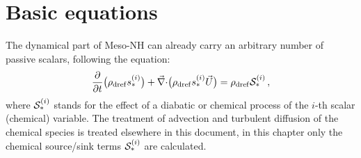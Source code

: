\section{Basic equations}
%
The dynamical part of Meso-NH
can already carry an arbitrary number of passive scalars,
following the equation:
%
\begin{equation}
\frac{\partial}{\partial t} \big(\rho_{\rm dref} {s}_\ast^{(i)}\big) + {\vec\nabla\cdot} \big(\rho_{\rm dref} {s}_\ast^{(i)} \vec U \big)
= \rho_{\rm dref} {\cal S}_\ast^{(i)}
\,,
\label{basic1}
\end{equation}
%
where ${\cal S}_\ast^{(i)}$  stands for the effect of a diabatic or chemical process 
of the $i$-th scalar (chemical) variable.
The treatment of advection and turbulent diffusion of the chemical
species is treated elsewhere in this document,
in this chapter only the chemical source/sink terms ${\cal S}_\ast^{(i)}$ are calculated.


